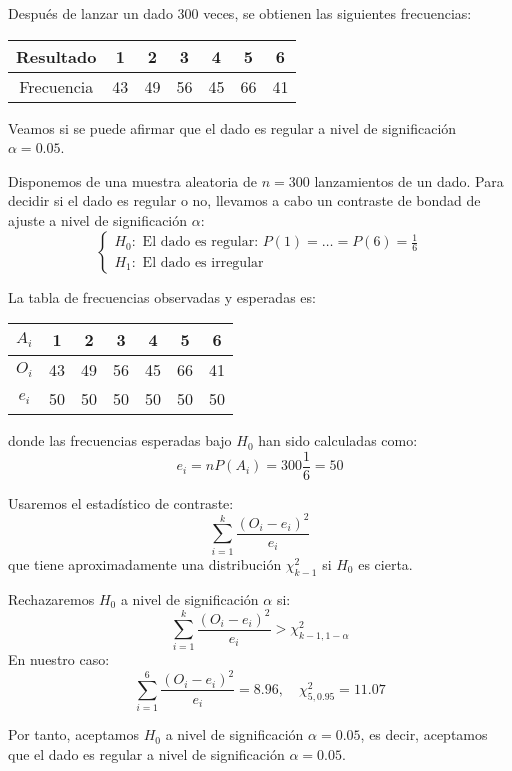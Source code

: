 \begin{example}
    Después de lanzar un dado 300 veces, se obtienen las siguientes frecuencias:
    \begin{center}
        \begin{tabular}{ | c | c c c c c c | }
            \hline
            Resultado  & 1  & 2  & 3  & 4  & 5  & 6  \\
            \hline
            Frecuencia & 43 & 49 & 56 & 45 & 66 & 41 \\
            \hline
        \end{tabular}
    \end{center}

    Veamos si se puede afirmar que el dado es regular a nivel de significación $\alpha = 0.05$.

    Disponemos de una muestra aleatoria de $n = 300$ lanzamientos de un dado.
    Para decidir si el dado es regular o no, llevamos a cabo un contraste de bondad de ajuste a nivel de significación $\alpha$:
    $$\begin{cases}
            H_0: \text{ El dado es regular: } P(1) = \dots = P(6) = \frac{1}{6} \\
            H_1: \text{ El dado es irregular}
        \end{cases}$$

    La tabla de frecuencias observadas y esperadas es:
    \begin{center}
        \begin{tabular}{| c | c c c c c c |}
            \hline
            $A_i$ & 1  & 2  & 3  & 4  & 5  & 6  \\
            \hline
            $O_i$ & 43 & 49 & 56 & 45 & 66 & 41 \\
            $e_i$ & 50 & 50 & 50 & 50 & 50 & 50 \\
            \hline
        \end{tabular}
    \end{center}
    donde las frecuencias esperadas bajo $H_0$ han sido calculadas como:
    $$e_i = nP(A_i) = 300 \frac{1}{6} = 50$$

    Usaremos el estadístico de contraste:
    $$\sum_{i=1}^k \frac{(O_i-e_i)^2}{e_i}$$
    que tiene aproximadamente una distribución $\chi^2_{k-1}$ si $H_0$ es cierta.

    Rechazaremos $H_0$ a nivel de significación $\alpha$ si:
    $$\sum_{i=1}^k \frac{(O_i-e_i)^2}{e_i} > \chi^2_{k-1, 1-\alpha}$$
    En nuestro caso:
    $$\sum_{i=1}^6 \frac{(O_i-e_i)^2}{e_i} = 8.96, \quad \chi^2_{5, 0.95} = 11.07$$

    Por tanto, aceptamos $H_0$ a nivel de significación $\alpha = 0.05$, es decir, aceptamos que el dado es regular a nivel de significación $\alpha = 0.05$.
\end{example}

